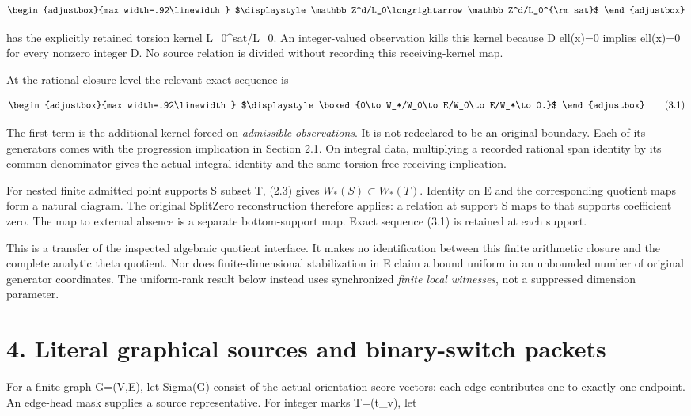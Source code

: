 \[
\begin{adjustbox}{max width=.92\linewidth}
$\displaystyle \mathbb Z^d/L_0\longrightarrow\mathbb Z^d/L_0^{\rm sat}$
\end{adjustbox}
\]

has the explicitly retained torsion kernel L\_0\^{}sat/L\_0. An integer-valued observation kills this kernel because D ell(x)=0 implies ell(x)=0 for every nonzero integer D. No source relation is divided without recording this receiving-kernel map.

At the rational closure level the relevant exact sequence is

\[
\begin{adjustbox}{max width=.92\linewidth}
$\displaystyle \boxed{0\to W_*/W_0\to E/W_0\to E/W_*\to0.}$
\end{adjustbox}
\tag{3.1}
\]

The first term is the additional kernel forced on \emph{admissible observations}. It is not redeclared to be an original boundary. Each of its generators comes with the progression implication in Section 2.1. On integral data, multiplying a recorded rational span identity by its common denominator gives the actual integral identity and the same torsion-free receiving implication.

For nested finite admitted point supports S subset T, (2.3) gives \(W_*(S)\subset W_*(T)\). Identity on E and the corresponding quotient maps form a natural diagram. The original SplitZero reconstruction therefore applies: a relation at support S maps to that support\textquotesingle s coefficient zero. The map to external absence is a separate bottom-support map. Exact sequence (3.1) is retained at each support.

This is a transfer of the inspected algebraic quotient interface. It makes no identification between this finite arithmetic closure and the complete analytic theta quotient. Nor does finite-dimensional stabilization in E claim a bound uniform in an unbounded number of original generator coordinates. The uniform-rank result below instead uses synchronized \emph{finite local witnesses}, not a suppressed dimension parameter.

\section{4. Literal graphical sources and binary-switch packets}\label{n16-literal-graphical-sources-and-binary-switch-packets}

For a finite graph G=(V,E), let Sigma(G) consist of the actual orientation score vectors: each edge contributes one to exactly one endpoint. An edge-head mask supplies a source representative. For integer marks T=(t\_v), let

